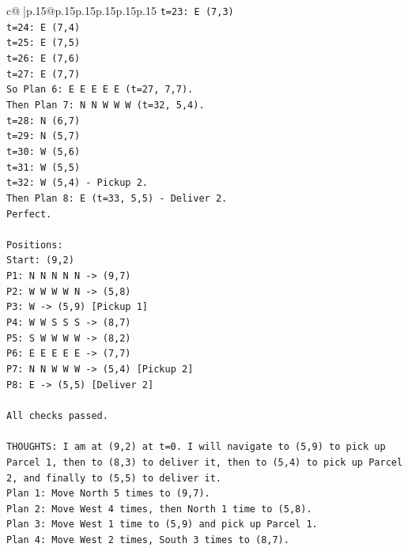 \documentclass{article}
\begin{document}
{\begin{supertabular}{c@{$\;$}|p{.15\linewidth}@{}p{.15\linewidth}p{.15\linewidth}p{.15\linewidth}p{.15\linewidth}p{.15\linewidth}}
{{{\texttt{t=23: E (7,3)} \\
\texttt{t=24: E (7,4)} \\
\texttt{t=25: E (7,5)} \\
\texttt{t=26: E (7,6)} \\
\texttt{t=27: E (7,7)} \\
\texttt{So Plan 6: E E E E E (t=27, 7,7).} \\
\texttt{Then Plan 7: N N W W W (t=32, 5,4).} \\
\texttt{t=28: N (6,7)} \\
\texttt{t=29: N (5,7)} \\
\texttt{t=30: W (5,6)} \\
\texttt{t=31: W (5,5)} \\
\texttt{t=32: W (5,4) {-} Pickup 2.} \\
\texttt{Then Plan 8: E (t=33, 5,5) {-} Deliver 2.} \\
\texttt{Perfect.} \\
\\ 
\texttt{Positions:} \\
\texttt{Start: (9,2)} \\
\texttt{P1: N N N N N {-}> (9,7)} \\
\texttt{P2: W W W W N {-}> (5,8)} \\
\texttt{P3: W {-}> (5,9) {[}Pickup 1{]}} \\
\texttt{P4: W W S S S {-}> (8,7)} \\
\texttt{P5: S W W W W {-}> (8,2)} \\
\texttt{P6: E E E E E {-}> (7,7)} \\
\texttt{P7: N N W W W {-}> (5,4) {[}Pickup 2{]}} \\
\texttt{P8: E {-}> (5,5) {[}Deliver 2{]}} \\
\\ 
\texttt{All checks passed.} \\
\\ 
\texttt{THOUGHTS: I am at (9,2) at t=0. I will navigate to (5,9) to pick up Parcel 1, then to (8,3) to deliver it, then to (5,4) to pick up Parcel 2, and finally to (5,5) to deliver it.} \\
\texttt{Plan 1: Move North 5 times to (9,7).} \\
\texttt{Plan 2: Move West 4 times, then North 1 time to (5,8).} \\
\texttt{Plan 3: Move West 1 time to (5,9) and pick up Parcel 1.} \\
\texttt{Plan 4: Move West 2 times, South 3 times to (8,7).} \\
}}}
\end{supertabular}}
\end{document}
